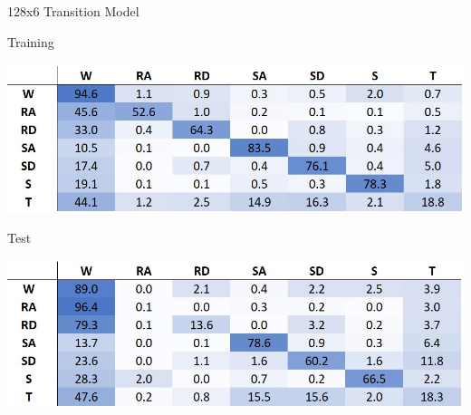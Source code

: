 \documentclass[sensors,article,submit,moreauthors,pdftex]{Definitions/mdpi}
\begin{document}
\begin{table}[!hbt]
    \centering
    \caption{128x6 Transition Model}
    \label{tab:128x6_transition_confusion_matrix}
    \begin{subtable}{.45\textwidth}
        \centering
        \caption{Training}
        \label{tab:tran_model_conf_matrix_training_128x6}
        \includegraphics[width=\textwidth]{Figures/results/conf_matricies/Training_128x6_T.jpg}
    \end{subtable}
    \hfil
    \begin{subtable}{.45\textwidth}
        \centering
        \caption{Test}
        \label{tab:tran_model_conf_matrix_test_128x6}
        \includegraphics[width=\textwidth]{Figures/results/conf_matricies/Test_128x6_T.jpg}
    \end{subtable}
\end{table}
\end{document}
